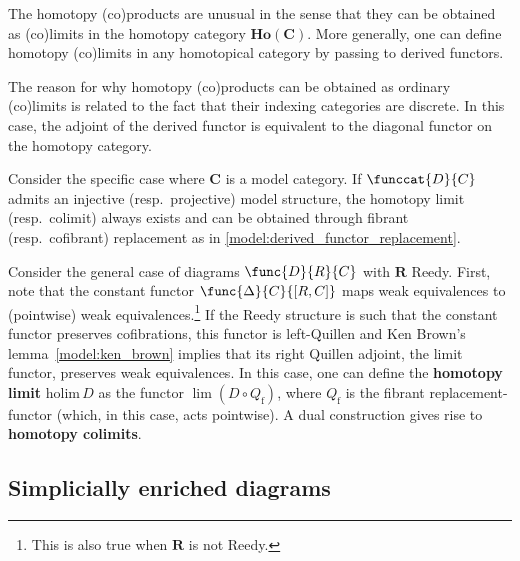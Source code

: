     The homotopy (co)products are unusual in the sense that they can be obtained as (co)limits in the homotopy category $\mathbf{Ho(C)}$. More generally, one can define homotopy (co)limits in any homotopical category by passing to derived functors.
    \begin{remark}
        The reason for why homotopy (co)products can be obtained as ordinary (co)limits is related to the fact that their indexing categories are discrete. In this case, the adjoint of the derived functor is equivalent to the diagonal functor on the homotopy category.
    \end{remark}

    \begin{property}
        Consider the specific case where $\mathbf{C}$ is a model category. If $\funccat{D}{C}$ admits an injective (resp.~projective) model structure, the homotopy limit (resp.~colimit) always exists and can be obtained through fibrant (resp.~cofibrant) replacement as in \cref{model:derived_functor_replacement}.
    \end{property}
    \begin{example}
        Consider the general case of diagrams $\func{D}{R}{C}$ with $\mathbf{R}$ Reedy. First, note that the constant functor $\func{\Delta}{C}{[R,C]}$ maps weak equivalences to (pointwise) weak equivalences.\footnote{This is also true when $\mathbf{R}$ is not Reedy.} If the Reedy structure is such that the constant functor preserves cofibrations, this functor is left-Quillen and Ken Brown's lemma~\ref{model:ken_brown} implies that its right Quillen adjoint, the limit functor, preserves weak equivalences. In this case, one can define the \textbf{homotopy limit} $\mathrm{holim}\,D$ as the functor $\lim(D\circ Q_\mathrm{f})$, where $Q_\mathrm{f}$ is the fibrant replacement-functor (which, in this case, acts pointwise). A dual construction gives rise to \textbf{homotopy colimits}.
    \end{example}

\subsection{Simplicially enriched diagrams}

